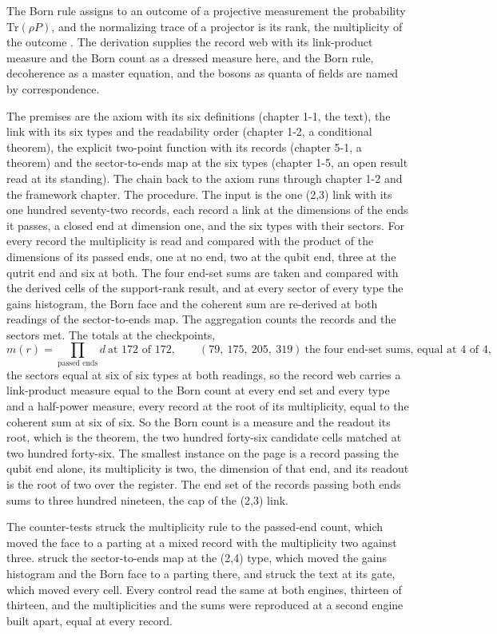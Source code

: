\begin{chbridge}
The Born rule assigns to an outcome of a projective measurement the probability $\mathrm{Tr}(\rho P)$, and the normalizing trace of a projector is its rank, the multiplicity of the outcome \cite{Chiribella2011}. The derivation supplies the record web with its link-product measure and the Born count as a dressed measure here, and the Born rule, decoherence as a master equation, and the bosons as quanta of fields are named by correspondence.
\end{chbridge}
\begin{chproof}[finite]
The premises are the axiom with its six definitions (chapter 1-1, the text), the link with its six types and the readability order (chapter 1-2, a conditional theorem), the explicit two-point function with its records (chapter 5-1, a theorem) and the sector-to-ends map at the six types (chapter 1-5, an open result read at its standing). The chain back to the axiom runs through chapter 1-2 and the framework chapter. The procedure. The input is the one (2,3) link with its one hundred seventy-two records, each record a link at the dimensions of the ends it passes, a closed end at dimension one, and the six types with their sectors. For every record the multiplicity is read and compared with the product of the dimensions of its passed ends, one at no end, two at the qubit end, three at the qutrit end and six at both. The four end-set sums are taken and compared with the derived cells of the support-rank result, and at every sector of every type the gains histogram, the Born face and the coherent sum are re-derived at both readings of the sector-to-ends map. The aggregation counts the records and the sectors met. The totals at the checkpoints,
\begin{equation}
m(r) = \prod_{\text{passed ends}} d \ \text{at } 172 \text{ of } 172,\qquad (79,\ 175,\ 205,\ 319) \ \text{the four end-set sums, equal at } 4 \text{ of } 4 ,
\end{equation}
the sectors equal at six of six types at both readings, so the record web carries a link-product measure equal to the Born count at every end set and every type and a half-power measure, every record at the root of its multiplicity, equal to the coherent sum at six of six. So the Born count is a measure and the readout its root, which is the theorem, the two hundred forty-six candidate cells matched at two hundred forty-six. The smallest instance on the page is a record passing the qubit end alone, its multiplicity is two, the dimension of that end, and its readout is the root of two over the register. The end set of the records passing both ends sums to three hundred nineteen, the cap of the (2,3) link.

The counter-tests struck the multiplicity rule to the passed-end count, which moved the face to a parting at a mixed record with the multiplicity two against three. struck the sector-to-ends map at the (2,4) type, which moved the gains histogram and the Born face to a parting there, and struck the text at its gate, which moved every cell. Every control read the same at both engines, thirteen of thirteen, and the multiplicities and the sums were reproduced at a second engine built apart, equal at every record.
\end{chproof}
